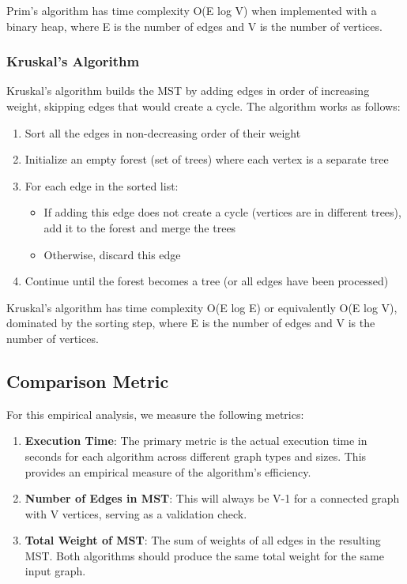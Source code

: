 \documentclass[a4paper,12pt]{article}
\begin{document}
Prim's algorithm has time complexity O(E log V) when implemented with a binary heap, where E is the number of edges and V is the number of vertices.
\subsubsection{Kruskal's Algorithm}
\label{sec:org46b01e9}
Kruskal's algorithm builds the MST by adding edges in order of increasing weight, skipping edges that would create a cycle. The algorithm works as follows:

\begin{enumerate}
\item Sort all the edges in non-decreasing order of their weight
\item Initialize an empty forest (set of trees) where each vertex is a separate tree
\item For each edge in the sorted list:
\begin{itemize}
\item If adding this edge does not create a cycle (vertices are in different trees), add it to the forest and merge the trees
\item Otherwise, discard this edge
\end{itemize}
\item Continue until the forest becomes a tree (or all edges have been processed)
\end{enumerate}

Kruskal's algorithm has time complexity O(E log E) or equivalently O(E log V), dominated by the sorting step, where E is the number of edges and V is the number of vertices.
\subsection{Comparison Metric}
\label{sec:org83ab280}
For this empirical analysis, we measure the following metrics:

\begin{enumerate}
\item \textbf{\textbf{Execution Time}}: The primary metric is the actual execution time in seconds for each algorithm across different graph types and sizes. This provides an empirical measure of the algorithm's efficiency.

\item \textbf{\textbf{Number of Edges in MST}}: This will always be V-1 for a connected graph with V vertices, serving as a validation check.

\item \textbf{\textbf{Total Weight of MST}}: The sum of weights of all edges in the resulting MST. Both algorithms should produce the same total weight for the same input graph.
\end{enumerate}
\end{document}
